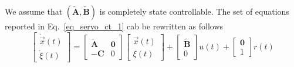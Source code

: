 \documentclass[12pt,a4paper,oneside]{book}
\begin{document}
\begin{onehalfspace}
We assume that $(\tilde{\mathbf{A}},\tilde{\mathbf{B}})$ is completely state 
controllable.
The set of equations reported in Eq.~\eqref{eq_servo_ct_1} cab be rewritten as 
follows
\begin{equation}\label{eq_servo_ct_2}
	\begin{bmatrix}
		\dot{\vec{x}}(t) \\[6pt] \dot{\xi}(t)
	\end{bmatrix} = 
	\begin{bmatrix}
		\tilde{\mathbf{A}} & \mathbf{0} \\[6pt]
		-{\mathbf{C}} & 0
	\end{bmatrix} 
	\begin{bmatrix}
		{\vec{x}}(t) \\[6pt] {\xi}(t)
	\end{bmatrix}+
	\begin{bmatrix}
		\tilde{\mathbf{B}} \\[6pt] 0
	\end{bmatrix}u(t)+
	\begin{bmatrix}
		{\mathbf{0}} \\[6pt] 1
	\end{bmatrix}r(t)
\end{equation}


\end{onehalfspace}
\end{document}
